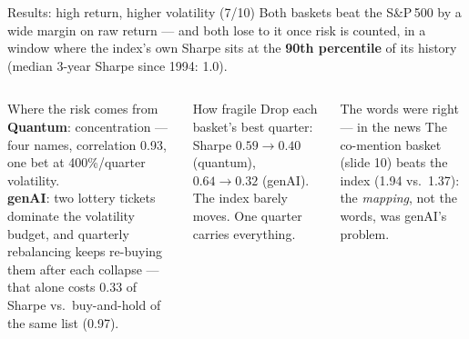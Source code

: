 \documentclass[10pt,aspectratio=169]{beamer}
\newcommand{\bd}[1]{\textcolor{bad}{#1}}
\begin{document}
\begin{frame}[t]{Results: high return, higher volatility (7/10)}
  \footnotesize
  Both baskets beat the S\&P\,500 by a wide margin on raw return --- and both lose to it
  once risk is counted, in a window where the index's own Sharpe sits at the \textbf{90th
  percentile} of its history (median 3-year Sharpe since 1994: 1.0).

  \vspace{0.15cm}
  \begin{columns}[T,onlytextwidth]
      \begin{block}{Where the risk comes from}
        \scriptsize
        \textbf{Quantum}: concentration --- four names, correlation 0.93, one bet at
        400\%/quarter volatility.\\[2pt]
        \textbf{genAI}: two lottery tickets dominate the volatility budget, and quarterly
        rebalancing keeps re-buying them after each collapse --- that alone costs
        \bd{0.33 of Sharpe} vs.\ buy-and-hold of the same list (0.97).
      \end{block}
      \begin{block}{How fragile}
        \scriptsize
        Drop each basket's best quarter: Sharpe $0.59 \to 0.40$ (quantum),
        $0.64 \to 0.32$ (genAI). The index barely moves. One quarter carries everything.
      \end{block}
      \begin{block}{The words were right --- in the news}
        \scriptsize
        The co-mention basket (slide 10) beats the index (1.94 vs.\ 1.37):
        the \emph{mapping}, not the words, was genAI's problem.
      \end{block}
  \end{columns}
\end{frame}
\end{document}
